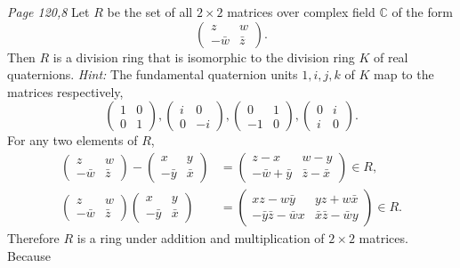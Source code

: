 \begin{enumerate}
\prob
\textit{Page 120,8 }%
Let $R$ be the set of all $2\times 2$ matrices over complex field $\mathbb{C}$ of the form
\[\begin{pmatrix}
	z & w \\
	-\bar{w} & \bar{z}
\end{pmatrix}.\]
Then $R$ is a division ring that is isomorphic to the division ring $K$ of real quaternions. \textit{Hint:} The fundamental quaternion units $1,i,j,k$ of $K$ map to the matrices respectively, 
\[\begin{pmatrix}
	1 & 0 \\
	0 & 1
\end{pmatrix},\begin{pmatrix}
	i & 0 \\
	0 & -i
\end{pmatrix},\begin{pmatrix}
	0 & 1 \\
	-1 & 0
\end{pmatrix},\begin{pmatrix}
	0 & i \\
	i & 0
\end{pmatrix}.\]
\soln
For any two elements of $R$, 
\begin{align*}
	\begin{pmatrix}
	z & w \\
-\bar{w} & \bar{z}
	\end{pmatrix}-\begin{pmatrix}
	x & y \\
-\bar{y} & \bar{x}
	\end{pmatrix}&=\begin{pmatrix}
	z-x & w-y \\
-\bar{w}+\bar{y} & \bar{z}-\bar{x}
	\end{pmatrix} \in R, \\
	\begin{pmatrix}
	z & w \\
-\bar{w} & \bar{z}
	\end{pmatrix} \begin{pmatrix}
	x & y \\
-\bar{y} & \bar{x}
	\end{pmatrix}&=\begin{pmatrix}
	xz-w\bar{y} & yz+w\bar{x} \\
-\bar{y}\bar{z}-\bar{w}x & \bar{x}\bar{z}-\bar{w}y
	\end{pmatrix} \in R.
\end{align*}
Therefore $R$ is a ring under addition and multiplication of $2\times 2$ matrices. Because

\end{enumerate}
